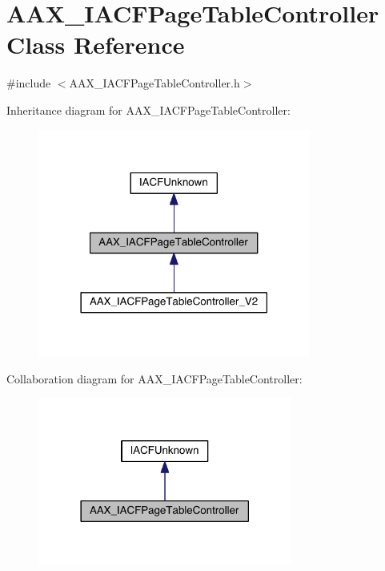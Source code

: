 \hypertarget{a00076}{}\section{A\+A\+X\+\_\+\+I\+A\+C\+F\+Page\+Table\+Controller Class Reference}
\label{a00076}


{\ttfamily \#include $<$A\+A\+X\+\_\+\+I\+A\+C\+F\+Page\+Table\+Controller.\+h$>$}



Inheritance diagram for A\+A\+X\+\_\+\+I\+A\+C\+F\+Page\+Table\+Controller\+:
\nopagebreak
\begin{figure}[H]
\begin{center}
\leavevmode
\includegraphics[width=254pt]{a00571}
\end{center}
\end{figure}


Collaboration diagram for A\+A\+X\+\_\+\+I\+A\+C\+F\+Page\+Table\+Controller\+:
\nopagebreak
\begin{figure}[H]
\begin{center}
\leavevmode
\includegraphics[width=237pt]{a00572}
\end{center}
\end{figure}


